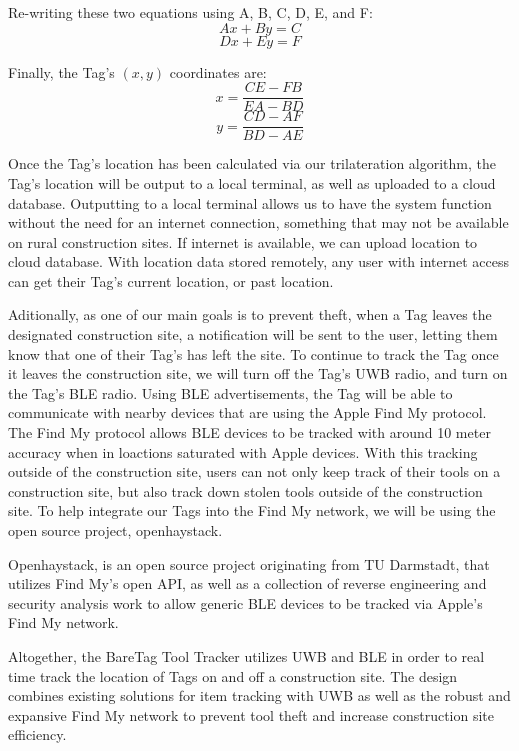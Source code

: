 \documentclass[conference]{IEEEtran}
\begin{document}
Re-writing these two equations using A, B, C, D, E, and F:
\[Ax + By = C\]
\[Dx + Ey = F\]

Finally, the Tag's $(x,y)$ coordinates are:
\[x = \frac{CE - FB}{EA - BD}\]
\[y = \frac{CD - AF}{BD - AE}\]

Once the Tag's location has been calculated via our trilateration algorithm,
the Tag's location will be output to a local terminal, as well as 
uploaded to a cloud database. Outputting to a local terminal allows us to
have the system function without the need for an internet connection, 
something that may not be available on rural construction sites. If internet
is available, we can upload location to cloud database. With location data
stored remotely, any user with internet access can get their Tag's current
location, or past location.

Aditionally, as one of our main goals is to prevent theft, when a Tag
leaves the designated construction site, a notification will be sent to 
the user, letting them know that one of their Tag's has left the site.
To continue to track the Tag once it leaves the construction site, we will
turn off the Tag's UWB radio, and turn on the Tag's BLE radio. Using BLE
advertisements, the Tag will be able to communicate with nearby devices that
are using the Apple Find My protocol. The Find My protocol allows BLE devices
to be tracked with around 10 meter accuracy when in loactions saturated with 
Apple devices. With this tracking outside of the construction site, users 
can not only keep track of their tools on a construction site, but also track
down stolen tools outside of the construction site. To help integrate our
Tags into the Find My network, we will be using the open source project,
openhaystack. 

Openhaystack, is an open source project originating from TU Darmstadt, that
utilizes Find My's open API, as well as a collection of reverse engineering
and security analysis work to allow generic BLE devices to be tracked via
Apple's Find My network.

Altogether, the BareTag Tool Tracker utilizes UWB and BLE in order to real
time track the location of Tags on and off a construction site. The design
combines existing solutions for item tracking with UWB as well as the robust
and expansive Find My network to prevent tool theft and increase construction
site efficiency.  
\end{document}
